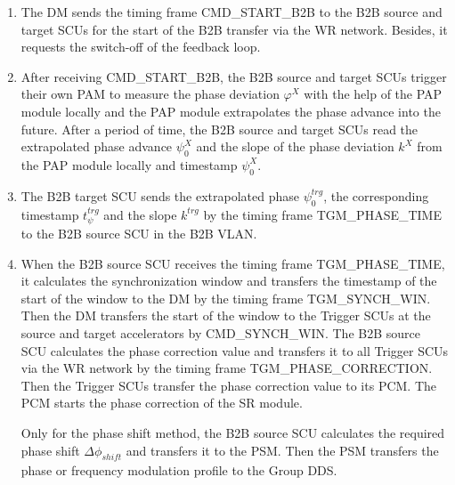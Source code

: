 \begin{enumerate}
\item The DM sends the timing frame CMD\_START\_B2B to the B2B source and target SCUs for the start of the B2B transfer via the WR network. Besides, it requests the switch-off of the feedback loop.

\item  After receiving CMD\_START\_B2B, the B2B source and target SCUs trigger their own PAM to measure the phase deviation $\varphi^X$ with the help of the PAP module locally and the PAP module extrapolates the phase advance into the future. After a period of time, the B2B source and target SCUs read the extrapolated phase advance $\psi^X_0$ and the slope of the phase deviation $k^\mathit{X}$ from the PAP module locally and timestamp $\psi^X_0$.  

\item  The B2B target SCU sends the extrapolated phase $\psi^\mathit{trg}_0$, the corresponding timestamp $t_\psi^\mathit{trg}$ and the slope $k^\mathit{trg}$ by the timing frame TGM\_PHASE\_TIME to the B2B source SCU in the B2B VLAN. 

\item  When the B2B source SCU receives the timing frame TGM\_PHASE\_TIME, it calculates the synchronization window and transfers the timestamp of the start of the window to the DM by the timing frame TGM\_SYNCH\_WIN. Then the DM transfers the start of the window to the Trigger SCUs at the source and target accelerators by CMD\_SYNCH\_WIN.
The B2B source SCU calculates the phase correction value and transfers it to all Trigger SCUs via the WR network by the timing frame TGM\_PHASE\_CORRECTION. Then the Trigger SCUs transfer the phase correction value to its \gls{PCM}. The PCM starts the phase correction of the SR module. 

Only for the phase shift method, the B2B source SCU calculates the required phase shift $\Delta \phi_\mathit{shift}$ and transfers it to the PSM. Then the PSM transfers the phase or frequency modulation profile to the Group DDS.  


\end{enumerate}

